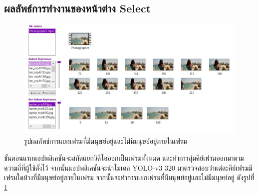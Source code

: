 \subsection*{ผลลัพธ์การทำงานของหน้าต่าง Select}
\begin{figure}[!ht]
  \centering
    \includegraphics[scale=0.6]{chapter4/images/Result/result_select3.jpg}
    \caption{รูปผลลัพธ์การแยกเฟรมที่มีมนุษย์อยู่และไม่มีมนุษย์อยู่ภายในเฟรม}
    \label{fig:result_select}
\end{figure}
ขั้นตอนแรกแอปพลิเคชันจะสกัดแยกวิดีโอออกเป็นเฟรมทั้งหมด และทำการสุ่มคีย์เฟรมออกมาตามความถี่ที่ผู้ใช้ตั้งไว้ จากนั้นแอปพลิเคชันจะนำโมเดล YOLO-v3 320 
มาตรวจสอบว่าแต่ละคีย์เฟรมมีเฟรมใดบ้างที่มีมนุษย์อยู่ภายในเฟรม จากนั้นจะทำการแยกเฟรมที่มีมนุษย์อยู่และไม่มีมนุษย์อยู่ ดังรูปที่ \ref{fig:result_select}


